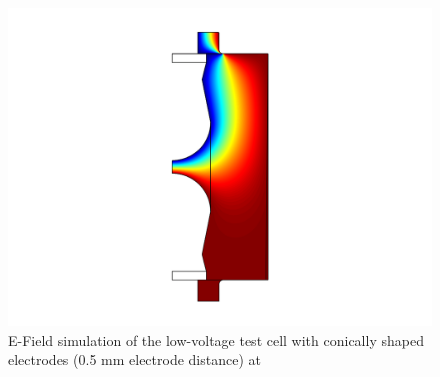 \begin{figure}[htbp]
	\centering
	\includegraphics[scale=0.3]{figures/Method/Part1_d_C0/conic.png}		
	\caption[Kurze Abbildungsbeschreibung]{E-Field simulation of the low-voltage test cell with conically shaped electrodes (0.5 mm electrode distance) at } \label{fig.comsol_conic}

\end{figure}

